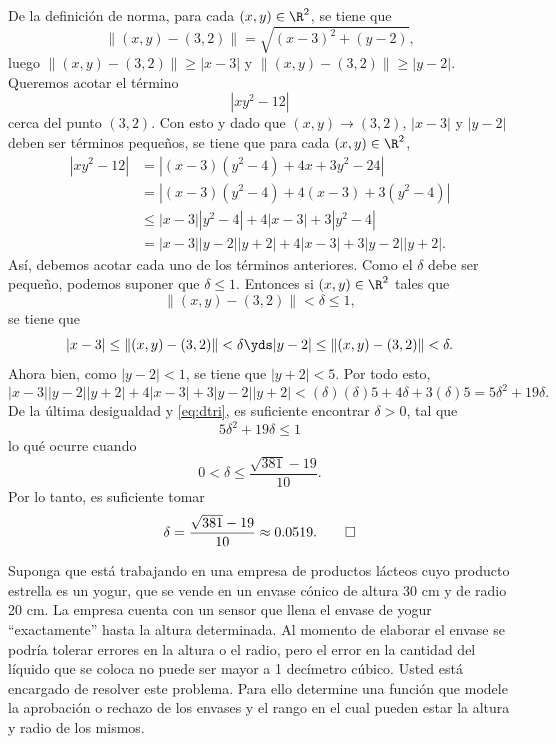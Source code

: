 \documentclass[a4,11pt]{aleph-examen}
\begin{document}
\begin{preguntas}
\begin{respuesta}
\begin{respuesta}    
    De la definición de norma, para cada $(x,y)\in\R^2$, se tiene que
    \[
        \|(x,y)-(3,2)\|=\sqrt{(x-3)^2+(y-2)},
    \]
    luego $\|(x,y)-(3,2)\|\geq |x-3|$ y $\|(x,y)-(3,2)\|\geq |y-2|$. Queremos acotar el término
    \[
        |xy^2-12|
    \]
    cerca del punto $(3,2)$. Con esto y dado que $(x,y)\to (3,2)$,  $|x-3|$ y $|y-2|$ deben ser términos pequeños, se tiene que para cada $(x,y)\in\R^2$, 
    \begin{equation}\label{eq:dtri}
        \begin{split}|xy^2-12|
        &=|(x-3)(y^2-4)+4x+3y^2-24|\\
        &=|(x-3)(y^2-4)+4(x-3)+3(y^2-4)|\\
        &\leq |x-3||y^2-4|+4|x-3|+3|y^2-4|\\
        &=|x-3||y-2||y+2|+4|x-3|+3|y-2||y+2|.
        \end{split}
    \end{equation}
    Así, debemos acotar cada uno de los términos anteriores. Como el $\delta$ debe ser pequeño, podemos suponer que $\delta\leq 1$. Entonces si $(x,y)\in\R^2$ tales que
    \[
        \|(x,y)-(3,2)\|<\delta\leq 1,
    \]
    se tiene que 
    \[
        |x-3|\leq \|(x,y)-(3,2)\|<\delta \yds 
        |y-2|\leq \|(x,y)-(3,2)\|<\delta.
    \]
    Ahora bien, como $|y-2|<1$, se tiene que $|y+2|<5$. Por todo esto,
    \[
        |x-3||y-2||y+2|+4|x-3|+3|y-2||y+2|
        <(\delta)( \delta) 5+4\delta +3 (\delta) 5
        =5\delta^2+19\delta. 
    \]
    De la última desigualdad y \eqref{eq:dtri}, es suficiente encontrar $\delta>0$, tal que
    \[
        5\delta^2+19\delta\leq 1
    \]
    lo qué ocurre cuando 
    \[
        0<\delta\leq \dfrac{ \sqrt{381} - 19}{10}.
    \]
    Por lo tanto, es suficiente tomar
    \[
        \delta=\dfrac{ \sqrt{381} - 19}{10}\approx 0.0519. \qedhere
    \]
\end{respuesta}


\item 
    Suponga que está trabajando en una empresa de productos lácteos cuyo producto estrella es un yogur, que se vende en un envase cónico de altura 30 cm y de radio 20 cm. La empresa cuenta con un sensor que llena el envase de yogur ``exactamente'' hasta la altura determinada. Al momento de elaborar el envase se podría tolerar errores en la altura o el radio, pero el error en la cantidad del líquido que se coloca no puede ser mayor a 1 decímetro cúbico. Usted está encargado de resolver este problema. Para ello determine una función que modele la aprobación o rechazo de los envases y el rango en el cual pueden estar la altura y radio de los mismos.
    

\end{respuesta}
\end{preguntas}
\end{document}
